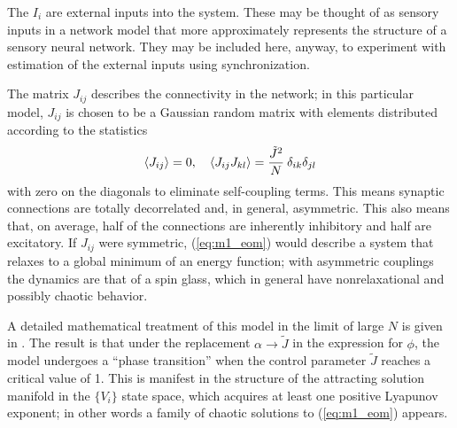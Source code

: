 \documentclass{article} %
\begin{document}
The $I_i$ are external inputs into the system.  These may be thought of as sensory inputs in a network model that more approximately represents the structure of a sensory neural network.  They may be included here, anyway, to experiment with estimation of the external inputs using synchronization.

The matrix $J_{ij}$ describes the connectivity in the network; in this particular model, $J_{ij}$ is chosen to be a Gaussian random matrix with elements distributed according to the statistics
\begin{align}
	\left\langle J_{ij} \right\rangle = 0, \quad \left\langle J_{ij}J_{kl} \right\rangle = \frac{\tilde{J}^2}{N} \: \delta_{ik}\delta_{jl} \label{eq:m1_stats}
\end{align}
with zero on the diagonals to eliminate self-coupling terms.  This means synaptic connections are totally decorrelated and, in general, asymmetric.  This also means that, on average, half of the connections are inherently inhibitory and half are excitatory.  If $J_{ij}$ were symmetric, (\ref{eq:m1_eom}) would describe a system that relaxes to a global minimum of an energy function; with asymmetric couplings the dynamics are that of a spin glass, which in general have nonrelaxational and possibly chaotic behavior.

A detailed mathematical treatment of this model in the limit of large $N$ is given in \cite{Sompolinsky1988}.  The result is that under the replacement $\alpha \rightarrow \tilde{J}$ in the expression for $\phi$, the model undergoes a ``phase transition'' when the control parameter $\tilde{J}$ reaches a critical value of 1.  This is manifest in the structure of the attracting solution manifold in the $\{V_i\}$ state space, which acquires at least one positive Lyapunov exponent; in other words a family of chaotic solutions to (\ref{eq:m1_eom}) appears.
\end{document}
